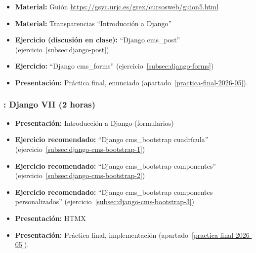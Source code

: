 \documentclass[a4paper,12pt]{article}
\begin{document}
\begin{itemize}
  
   \item \textbf{Material:} Guión \url{https://gsyc.urjc.es/grex/cursosweb/guion5.html}
   \item \textbf{Material:} Transparencias ``Introducción a Django''
   \item \textbf{Ejercicio (discusión en clase):} ``Django cms\_post'' (ejercicio~\ref{subsec:django-post}).
   \item \textbf{Ejercicio:} ``Django cms\_forms'' (ejercicio~\ref{subsec:django-forms}) \\
  \item \textbf{Presentación:} Práctica final, enunciado (apartado~\ref{practica-final-2026-05}).
\end{itemize}

\subsubsection{\juevesM: Django VII (2 horas)}
\label{cal:juevesM}

\begin{itemize}
  \item \textbf{Presentación:} Introducción a Django (formularios)
  \item \textbf{Ejercicio recomendado:} ``Django cms\_bootstrap cuadrícula'' (ejercicio~\ref{subsec:django-cms-bootstrap-1})
   \item \textbf{Ejercicio recomendado:} ``Django cms\_bootstrap componentes'' (ejercicio~\ref{subsec:django-cms-bootstrap-2})
   \item \textbf{Ejercicio recomendado:} ``Django cms\_bootstrap componentes personalizados'' (ejercicio~\ref{subsec:django-cms-bootstrap-3})
   \item \textbf{Presentación:} HTMX
   
\item \textbf{Presentación:} Práctica final, implementación (apartado~\ref{practica-final-2026-05}).
\end{itemize}
\end{document}
